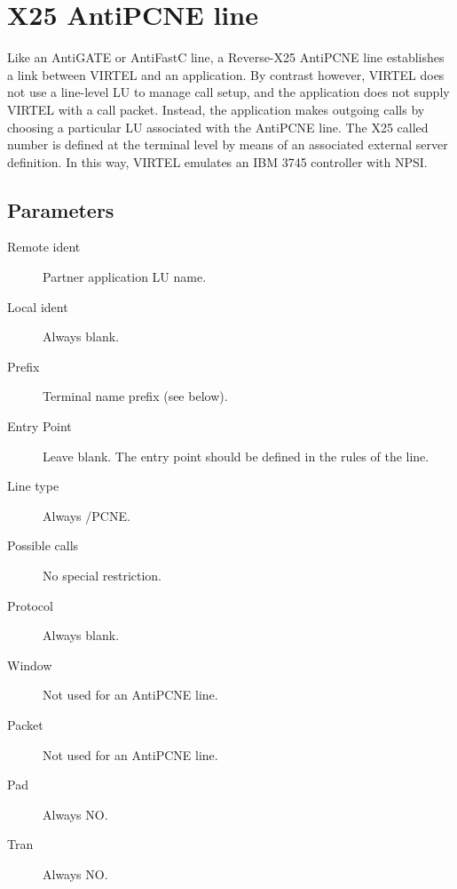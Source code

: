 \documentclass[letterpaper,10pt,english]{sphinxmanual}
\begin{document}
\section{X25 AntiPCNE line}
\label{\detokenize{connectivity_guide:x25-antipcne-line}}\label{\detokenize{connectivity_guide:index-82}}
Like an AntiGATE or AntiFastC line, a Reverse-X25 AntiPCNE line establishes a link between VIRTEL and an application. By contrast however, VIRTEL does not use a line-level LU to manage call setup, and the application does not supply VIRTEL with a call packet. Instead, the application makes outgoing calls by choosing a particular LU associated with the AntiPCNE line. The X25 called number is defined at the terminal level by means of an associated external server definition. In this way, VIRTEL emulates an IBM 3745 controller with NPSI.


\ignorespaces 

\subsection{Parameters}
\label{\detokenize{connectivity_guide:index-83}}\label{\detokenize{connectivity_guide:id40}}\begin{description}
\item[{Remote ident}] \leavevmode
Partner application LU name.

\item[{Local ident}] \leavevmode
Always blank.

\item[{Prefix}] \leavevmode
Terminal name prefix (see below).

\item[{Entry Point}] \leavevmode
Leave blank. The entry point should be defined in the rules of the line.

\item[{Line type}] \leavevmode
Always /PCNE.

\item[{Possible calls}] \leavevmode
No special restriction.

\item[{Protocol}] \leavevmode
Always blank.

\item[{Window}] \leavevmode
Not used for an AntiPCNE line.

\item[{Packet}] \leavevmode
Not used for an AntiPCNE line.

\item[{Pad}] \leavevmode
Always NO.

\item[{Tran}] \leavevmode
Always NO.

\end{description}
\end{document}
